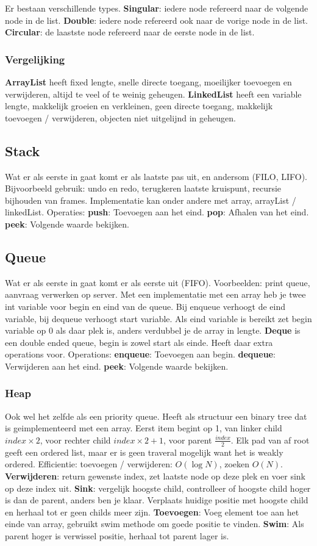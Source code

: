 Er bestaan verschillende types.
\textbf{Singular}: iedere node refereerd naar de volgende node in de list.
\textbf{Double}: iedere node refereerd ook naar de vorige node in de list.
\textbf{Circular}: de laastste node refereerd naar de eerste node in de list.

\subsubsection{Vergelijking}
\textbf{ArrayList} heeft fixed lengte, snelle directe toegang, moeilijker toevoegen en verwijderen, altijd te veel of te weinig geheugen.
\textbf{LinkedList} heeft een variable lengte, makkelijk groeien en verkleinen, geen directe toegang, makkelijk toevoegen / verwijderen, objecten niet uitgelijnd in geheugen.

\subsection{Stack}
Wat er als eerste in gaat komt er als laatste pas uit, en andersom (FILO, LIFO).
Bijvoorbeeld gebruik: undo en redo, terugkeren laatste kruispunt, recursie bijhouden van frames.
Implementatie kan onder andere met array, arrayList / linkedList.
Operaties:
\textbf{push}: Toevoegen aan het eind.
\textbf{pop}: Afhalen van het eind.
\textbf{peek}: Volgende waarde bekijken.

\subsection{Queue}
Wat er als eerste in gaat komt er als eerste uit (FIFO).
Voorbeelden: print queue, aanvraag verwerken op server.
Met een implementatie met een array heb je twee int variable voor begin en eind van de queue.
Bij enqueue verhoogt de eind variable, bij dequeue verhoogt start variable.
Als eind variable is bereikt zet begin variable op 0 als daar plek is, anders verdubbel je de array in lengte.
\textbf{Deque} is een double ended queue, begin is zowel start als einde.
Heeft daar extra operations voor.
Operations:
\textbf{enqueue}: Toevoegen aan begin.
\textbf{dequeue}: Verwijderen aan het eind.
\textbf{peek}: Volgende waarde bekijken.


\subsubsection{Heap}
Ook wel het zelfde als een priority queue.
Heeft als structuur een binary tree dat is geimplementeerd met een array.
Eerst item begint op 1, van linker child $index \times 2$, voor rechter child $index \times 2 + 1$, voor parent $\frac{index}{2}$.
Elk pad van af root geeft een ordered list, maar er is geen traveral mogelijk want het is weakly ordered.
Efficientie: toevoegen / verwijderen: $O(\log N)$, zoeken $O(N)$.
\textbf{Verwijderen}: return gewenste index, zet laatste node op deze plek en voer sink op deze index uit.
\textbf{Sink}: vergelijk hoogste child, controlleer of hoogste child hoger is dan de parent, anders ben je klaar.
Verplaats huidige positie met hoogste child en herhaal tot er geen childs meer zijn.
\textbf{Toevoegen}: Voeg element toe aan het einde van array, gebruikt swim methode om goede positie te vinden.
\textbf{Swim}: Als parent hoger is verwissel positie, herhaal tot parent lager is.
